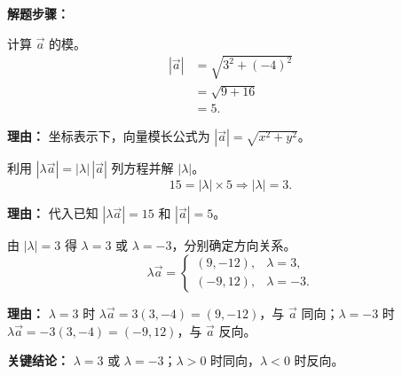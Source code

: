 \begin{examplebox}
	\textbf{\textcolor{CExample}{解题步骤：}}
	\begin{description}[style=nextline, leftmargin=2.8em, labelsep=0.5em, itemsep=0.45em]
		\item[\textbf{第一步（求原模长）：}]
		      计算 $\vec{a}$ 的模。
		      \[
			      \begin{aligned}
				      |\vec{a}|
				       & = \sqrt{3^2+(-4)^2} \\
				       & = \sqrt{9+16}       \\
				       & = 5.
			      \end{aligned}
		      \]
		      \par\textbf{理由：} 坐标表示下，向量模长公式为 $|\vec{a}|=\sqrt{x^2+y^2}$。
		\item[\textbf{第二步（列模长方程）：}]
		      利用 $|\lambda\vec{a}| = |\lambda|\,|\vec{a}|$ 列方程并解 $|\lambda|$。
		      \[
			      15 = |\lambda|\times 5 \Longrightarrow |\lambda|=3.
		      \]
		      \par\textbf{理由：} 代入已知 $|\lambda\vec{a}|=15$ 和 $|\vec{a}|=5$。
		\item[\textbf{第三步（求 $\lambda$ 和方向）：}]
		      由 $|\lambda|=3$ 得 $\lambda=3$ 或 $\lambda=-3$，分别确定方向关系。
		      \[
			      \lambda\vec{a}=
			      \begin{cases}
				      (9,-12), & \lambda=3,  \\[2pt]
				      (-9,12), & \lambda=-3.
			      \end{cases}
		      \]
		      \par\textbf{理由：} $\lambda=3$ 时 $\lambda\vec{a}=3(3,-4)=(9,-12)$，与 $\vec{a}$ 同向；$\lambda=-3$ 时 $\lambda\vec{a}=-3(3,-4)=(-9,12)$，与 $\vec{a}$ 反向。
	\end{description}
	\textbf{\textcolor{CExample}{关键结论：}}
	$\lambda=3$ 或 $\lambda=-3$；$\lambda>0$ 时同向，$\lambda<0$ 时反向。
\end{examplebox}